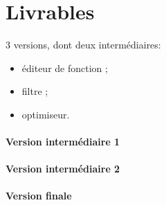 \section{Livrables}
	\label{sec:livrables}

	3 versions, dont deux intermédiaires:
	\begin{itemize}
		\item éditeur de fonction ; 
		\item filtre ; 
		\item optimiseur.
	\end{itemize}

	\paragraph{Version intermédiaire 1}

	\paragraph{Version intermédiaire 2}

	\paragraph{Version finale}